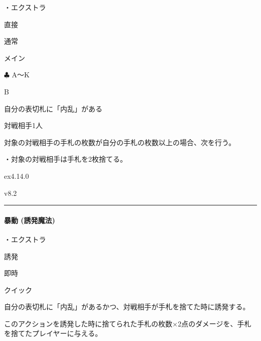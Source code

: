 \documentclass[letterpaper,10pt,dvipdfmx]{sphinxmanual}
\begin{document}
\sphinxAtStartPar
・エクストラ

\sphinxAtStartPar
{} 直接

\sphinxAtStartPar
{} 通常

\sphinxAtStartPar
{} メイン

\sphinxAtStartPar
{} {\normalsize $\clubsuit$} A〜K

\sphinxAtStartPar
{} B

\sphinxAtStartPar
{}

\sphinxAtStartPar
自分の表切札に「内乱」がある

\sphinxAtStartPar
{}

\sphinxAtStartPar
対戦相手1人

\sphinxAtStartPar
{}

\sphinxAtStartPar
対象の対戦相手の手札の枚数が自分の手札の枚数以上の場合、次を行う。

\sphinxAtStartPar
・対象の対戦相手は手札を2枚捨てる。

\sphinxAtStartPar
{}  ex4.14.0

\sphinxAtStartPar
{}  v8.2


\bigskip\hrule\bigskip



\paragraph{暴動 (誘発魔法)}
\label{\detokenize{auto/frameActionlist:act-riot}}\label{\detokenize{auto/frameActionlist:id73}}
\sphinxAtStartPar
{}

\sphinxAtStartPar
・エクストラ

\sphinxAtStartPar
{} 誘発

\sphinxAtStartPar
{} 即時

\sphinxAtStartPar
{} クイック

\sphinxAtStartPar
{}

\sphinxAtStartPar
自分の表切札に「内乱」があるかつ、対戦相手が手札を捨てた時に誘発する。

\sphinxAtStartPar
{}

\sphinxAtStartPar
このアクションを誘発した時に捨てられた手札の枚数×2点のダメージを、手札を捨てたプレイヤーに与える。
\end{document}

